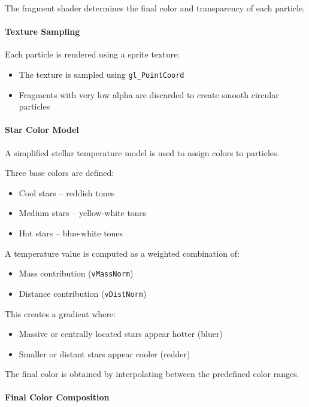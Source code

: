 \documentclass[12pt]{article}
\begin{document}
The fragment shader determines the final color and transparency of each particle.

\paragraph{Texture Sampling}

Each particle is rendered using a sprite texture:
\begin{itemize}
\item The texture is sampled using \texttt{gl\_PointCoord}
\item Fragments with very low alpha are discarded to create smooth circular particles
\end{itemize}

\paragraph{Star Color Model}

A simplified stellar temperature model is used to assign colors to particles.

Three base colors are defined:
\begin{itemize}
\item Cool stars – reddish tones
\item Medium stars – yellow-white tones
\item Hot stars – blue-white tones
\end{itemize}

A temperature value is computed as a weighted combination of:
\begin{itemize}
\item Mass contribution (\texttt{vMassNorm})
\item Distance contribution (\texttt{vDistNorm})
\end{itemize}

This creates a gradient where:
\begin{itemize}
\item Massive or centrally located stars appear hotter (bluer)
\item Smaller or distant stars appear cooler (redder)
\end{itemize}

The final color is obtained by interpolating between the predefined color ranges.


\paragraph{Final Color Composition}
\end{document}
